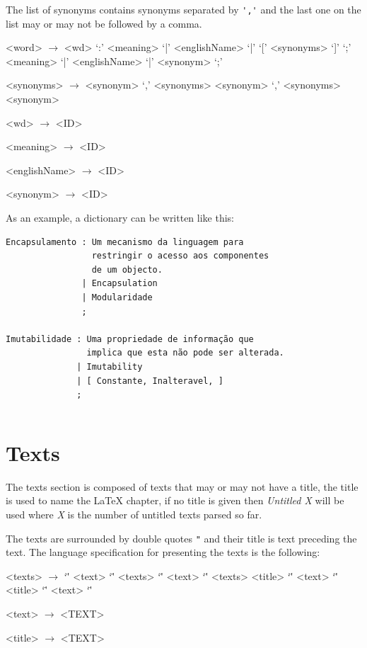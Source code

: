 \documentclass[a4paper]{report}
\begin{document}
The list of synonyms contains synonyms separated by \verb!','! and the last one
on the list may or may not be followed by a comma.

\begin{grammar}
    <word> $\to$ <wd> `:' <meaning> `|' <englishName> `|' `[' <synonyms> `]' `;'
    \alt{} <meaning> `|' <englishName> `|' <synonym> `;'

    <synonyms> $\to$ <synonym> `,'
    \alt{} <synonyms> <synonym> `,'
    \alt{} <synonyms> <synonym>

    <wd> $\to$ <ID>

    <meaning> $\to$ <ID>

    <englishName> $\to$ <ID>

    <synonym> $\to$ <ID>
\end{grammar}

As an example, a dictionary can be written like this:

\begin{verbatim}
Encapsulamento : Um mecanismo da linguagem para
                 restringir o acesso aos componentes
                 de um objecto.
               | Encapsulation
               | Modularidade
               ;

Imutabilidade : Uma propriedade de informação que
                implica que esta não pode ser alterada.
              | Imutability
              | [ Constante, Inalteravel, ]
              ;
\end{verbatim}

\inputminted[firstline=17,lastline=36]{C}{../src/sati.y}

\section{Texts}

The texts section is composed of texts that may or may not have a title, the
title is used to name the \LaTeX{} chapter, if no title is given then
\textit{Untitled X} will be used where \textit{X} is the number of untitled
texts parsed so far.

The texts are surrounded by double quotes \verb!"! and their title is text
preceding the text. The language specification for presenting the texts is the
following:

\begin{grammar}
<texts> $\to$ `\"' <text> `\"'
      \alt{} <texts> `\"' <text> `\"'
      \alt{} <texts> <title> `\"' <text> `\"'
      \alt{} <title> `\"' <text> `\"'

<text> $\to$ <TEXT>

<title> $\to$ <TEXT>
\end{grammar}
\end{document}
